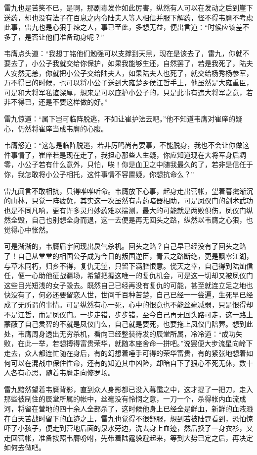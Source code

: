 雷九也是苦笑不已，是啊，那剧毒发作如此厉害，纵然有人可以在发动之后到崖下送药，却也没有法子在百息之内令陆夫人等人相信并服下解药，怪不得韦膺不考虑此事，雷九也是心狠手辣之人，事已至此，多想无益，便出言道：“时候应该差不多了，是否让他们准备动身呢？”

韦膺点头道：“我想丁铭他们勉强可以支撑到天黑，现在是该去了，雷九，你就不要去了，小公子我就交给你保护，如果我能够生还，自然罢了，若是我死了，陆夫人安然无恙，你就把小公子交给陆夫人，如果陆夫人也死了，就交给杨秀杨参军，万不得已的时候，也可以将小公子送到大雍楚乡侯江哲手上，他虽然是大雍重臣，可是和大将军私谊深厚，想来是可以庇护小公子的，只是此事有违大将军之意，若非不得已，还是不要这样做的好。”

雷九惊道：“属下岂可临阵脱逃，不如让崔护法去吧。”他不知道韦膺对崔庠的疑心，仍然将崔庠当成韦膺的心腹。

韦膺怒道：“这怎是临阵脱逃，若非厉鸣尚有要事，不能脱身，我也不会让你做这件事情了，崔庠若是现在走了，我担心那些人生疑，你应知道现在大将军身后凋零，小公子若有什么意外，只怕，唉！你是血卫之中随我最久的了，若非是信任于你，我怎敢将小公子相托，这件事情不容置疑，你想抗命么？”

雷九闻言不敢相抗，只得唯唯听命。韦膺放下心事，起身走出营帐，望着暮霭渐沉的山林，只觉一阵疲惫，其实这一次虽然有毒药暗器相助，可是凤仪门的剑术武功也是不同凡响，更有许多灵丹妙药难以揣测，最大的可能就是两败俱伤，凤仪门纵然全毁，自己也别想全身而退，这一去便是再无回头之路，纵然以韦膺之心狠，也觉得心中怅然。

可是渐渐的，韦膺眉宇间现出戾气杀机。回头之路？自己早已经没有了回头之路了！自己从堂堂的相国公子成为今日的叛国逆臣，青云之路断绝，更是飘零江湖，与草木同朽，归乡不得，复仇无望，只留下满腔恨意。侥天之幸，自己得到陆灿信任，便一心助他征战疆场，希望把握这唯一的复仇机会，可是这一切却又被凤仪门这些目光短浅的女子毁去。既然自己已经再没有复仇的可能，甚至就连立足之地也快没有了，何必还要留恋人世，世间千百种苦楚，自己已经一一尝遍，生死早已经成了无所谓的事情。可是纵然有心一死，心中的恨意也不能丝毫减弱，只是恨得却不是江哲，而是凤仪门。一步走错，步步错，至今自己再无回头路可走，这一路上蒙蔽了自己灵智的不就是凤仪门么，自己就是要死，也要拖上凤仪门陪葬。想到此处，韦膺周身透出无穷杀机，看向已经整装待发的辰堂所属，冷冷道：“成功失败，在此一举，若想搏得富贵荣华，就随本座舍命一拼吧。”说罢便大步流星向岭下走去，众人都连忙随在身后，有的幻想着唾手可得的荣华富贵，有的紧张地想着如何可以在混战中保住性命，还有的知道其中凶险，却暗自下了狠心不死无休，数十人各有心思，随着韦膺走向修罗场。

雷九黯然望着韦膺背影，直到众人身影都已没入暮霭之中，这才提了一把刀，走入那些被制住的辰堂所属的帐中，丝毫没有怜悯之意，一刀一个，杀得帐内血流成河，将留在营地的四十余人全部杀了，这时候他身上已经全是鲜血，新鲜的血液溅在白天苦战时留下的血迹之上，雷九也觉得不很舒服，想到若被陆霆看到，恐怕惊吓了小孩子，便走到营地后面的泉水旁边，洗去身上血迹，然后换了一身衣衫，又走回营帐，准备按照韦膺吩咐，先带着陆霆躲避起来，等到大势已定之后，再决定如何去做吧。


